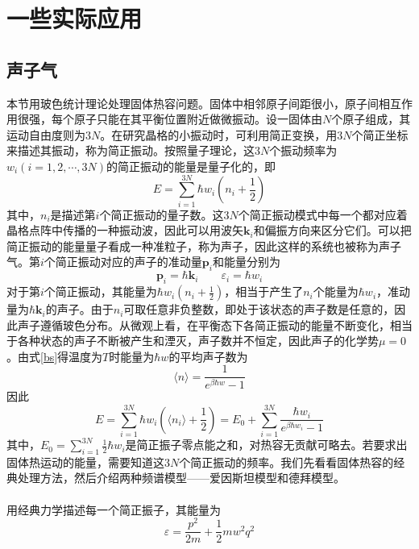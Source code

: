 \documentclass[UTF8,oneside,openany]{ctexbook}
\newcommand\aver[1]{\langle#1\rangle}
\begin{document}
\chapter{一些实际应用}
\section{声子气}
本节用玻色统计理论处理固体热容问题。固体中相邻原子间距很小，原子间相互作用很强，每个原子只能在其平衡位置附近做微振动。设一固体由$N$个原子组成，其运动自由度则为$3N$。在研究晶格的小振动时，可利用简正变换，用$3N$个简正坐标来描述其振动，称为简正振动。按照量子理论，这$3N$个振动频率为$w_i(i=1,2,\cdots,3N)$的简正振动的能量是量子化的，即
\begin{equation}
E=\sum_{i=1}^{3N}\hbar w_i(n_i+\frac12)
\end{equation}
其中，$n_i$是描述第$i$个简正振动的量子数。这$3N$个简正振动模式中每一个都对应着晶格点阵中传播的一种振动波，因此可以用波矢$\pmb{k}_i$和偏振方向来区分它们。可以把简正振动的能量量子看成一种准粒子，称为声子，因此这样的系统也被称为声子气。第$i$个简正振动对应的声子的准动量$\pmb{p}_i$和能量分别为
\begin{equation}
\pmb{p}_i=\hbar\pmb{k}_i\qquad \varepsilon_i=\hbar w_i
\end{equation}
对于第$i$个简正振动，其能量为$\hbar w_i(n_i+\frac12)$，相当于产生了$n_i$个能量为$\hbar w_i$，准动量为$\hbar\pmb{k}_i$的声子。由于$n_i$可取任意非负整数，即处于该状态的声子数是任意的，因此声子遵循玻色分布。从微观上看，在平衡态下各简正振动的能量不断变化，相当于各种状态的声子不断被产生和湮灭，声子数并不恒定，因此声子的化学势$\mu=0$。由式\ref{bs}得温度为$T$时能量为$\hbar w$的平均声子数为
\begin{equation}
\aver{n}=\frac{1}{e^{\beta\hbar w}-1}
\end{equation}
因此
\begin{equation}\label{energy}
E=\sum_{i=1}^{3N}\hbar w_i(\aver{n_i}+\frac12)=E_0+\sum_{i=1}^{3N}\frac{\hbar w_i}{e^{\beta\hbar w_i}-1}
\end{equation}
其中，$E_0=\sum_{i=1}^{3N}\frac12\hbar w_i$是简正振子零点能之和，对热容无贡献可略去。若要求出固体热运动的能量，需要知道这$3N$个简正振动的频率。我们先看看固体热容的经典处理方法，然后介绍两种频谱模型——爱因斯坦模型和德拜模型。
\\
\\
用经典力学描述每一个简正振子，其能量为
\begin{equation}
\varepsilon=\frac{p^2}{2m}+\frac12mw^2q^2
\end{equation}
\end{document}
